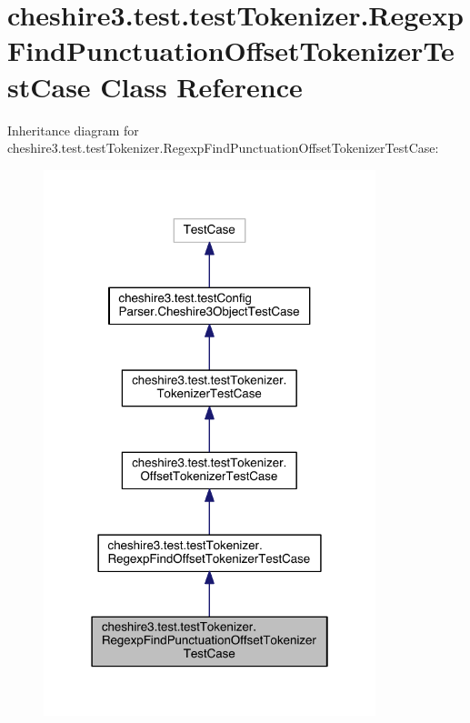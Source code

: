 \hypertarget{classcheshire3_1_1test_1_1test_tokenizer_1_1_regexp_find_punctuation_offset_tokenizer_test_case}{\section{cheshire3.\-test.\-test\-Tokenizer.\-Regexp\-Find\-Punctuation\-Offset\-Tokenizer\-Test\-Case Class Reference}
\label{classcheshire3_1_1test_1_1test_tokenizer_1_1_regexp_find_punctuation_offset_tokenizer_test_case}
}


Inheritance diagram for cheshire3.\-test.\-test\-Tokenizer.\-Regexp\-Find\-Punctuation\-Offset\-Tokenizer\-Test\-Case\-:
\nopagebreak
\begin{figure}[H]
\begin{center}
\leavevmode
\includegraphics[width=274pt]{classcheshire3_1_1test_1_1test_tokenizer_1_1_regexp_find_punctuation_offset_tokenizer_test_case__inherit__graph}
\end{center}
\end{figure}


